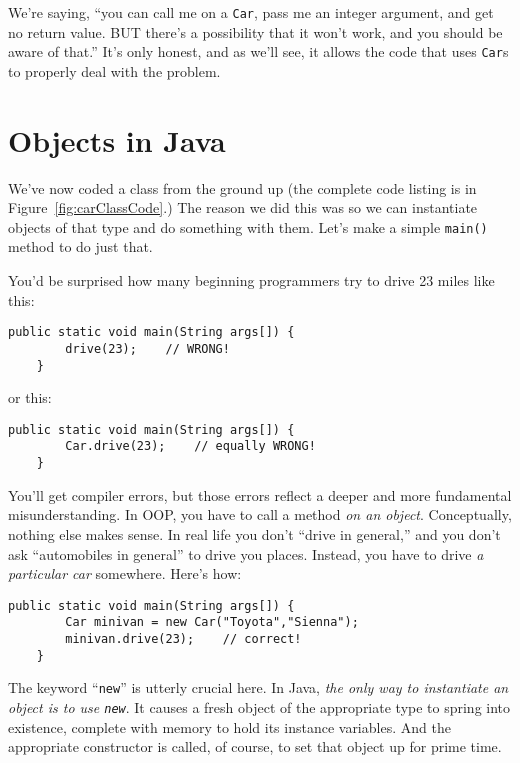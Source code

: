 We're saying, ``you can call me on a \texttt{Car}, pass me an integer
argument, and get no return value. BUT there's a possibility that it won't
work, and you should be aware of that.'' It's only honest, and as we'll see, it
allows the code that uses \texttt{Car}s to properly deal with the problem.



\section{Objects in Java}

We've now coded a class from the ground up (the complete code listing is in
Figure~\ref{fig:carClassCode}.) The reason we did this was so we can
instantiate objects of that type and do something with them. Let's make a
simple \texttt{main()} method to do just that.

You'd be surprised how many beginning programmers try to drive 23 miles like
this:

\begin{Verbatim}[samepage=true,fontsize=\scriptsize,frame=single]
    public static void main(String args[]) {
        drive(23);    // WRONG!
    }
\end{Verbatim}

or this:

\begin{Verbatim}[samepage=true,fontsize=\scriptsize,frame=single]
    public static void main(String args[]) {
        Car.drive(23);    // equally WRONG!
    }
\end{Verbatim}

You'll get compiler errors, but those errors reflect a deeper and more
fundamental misunderstanding. In OOP, you have to call a method \textit{on an
object}. Conceptually, nothing else makes sense. In real life you don't
``drive in general,'' and you don't ask ``automobiles in general'' to drive you
places. Instead, you have to drive \textit{a particular car} somewhere. Here's
how:

\begin{Verbatim}[samepage=true,fontsize=\scriptsize,frame=single]
    public static void main(String args[]) {
        Car minivan = new Car("Toyota","Sienna");
        minivan.drive(23);    // correct!
    }
\end{Verbatim}

The keyword ``\texttt{new}'' is utterly crucial here. In Java, \textit{the only
way to instantiate an object is to use \texttt{new}}. It causes a fresh object
of the appropriate type to spring into existence, complete with memory to hold
its instance variables. And the appropriate constructor is called, of course,
to set that object up for prime time.

